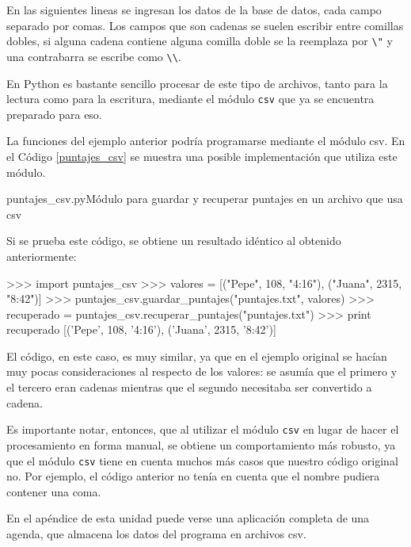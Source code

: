 En las siguientes lineas se ingresan los datos de la base de datos, cada
campo separado por comas. Los campos que son cadenas se suelen escribir
entre comillas dobles, si alguna cadena contiene alguna comilla doble se la
reemplaza por \verb!\"! y una contrabarra se escribe como \verb!\\!.

En Python es bastante sencillo procesar de este tipo de archivos, tanto
para la lectura como para la escritura, mediante el módulo \verb!csv! que
ya se encuentra preparado para eso.

La funciones del ejemplo anterior podría programarse mediante el módulo
csv.  En el Código \ref{puntajes_csv} se muestra una posible implementación
que utiliza este módulo.

\begin{codigo}{puntajes\_csv.py}{Módulo para guardar y recuperar puntajes en un archivo que usa csv}
\label{puntajes_csv}

\end{codigo}

Si se prueba este código, se obtiene un resultado idéntico al obtenido
anteriormente:

\begin{codigo-python-sn}
>>> import puntajes_csv
>>> valores = [("Pepe", 108, "4:16"), ("Juana", 2315, "8:42")]
>>> puntajes_csv.guardar_puntajes("puntajes.txt", valores)
>>> recuperado = puntajes_csv.recuperar_puntajes("puntajes.txt")
>>> print recuperado
[('Pepe', 108, '4:16'), ('Juana', 2315, '8:42')]
\end{codigo-python-sn}

El código, en este caso, es muy similar, ya que en el ejemplo original se
hacían muy pocas consideraciones al respecto de los valores: se asumía que
el primero y el tercero eran cadenas mientras que el segundo necesitaba ser
convertido a cadena.

\begin{observacion}
Es importante notar, entonces, que al utilizar el módulo \lstinline!csv!
en lugar de hacer el procesamiento en forma manual, se obtiene un
comportamiento más robusto, ya que el módulo \lstinline!csv! tiene en
cuenta muchos más casos que nuestro código original no. Por ejemplo, el
código anterior no tenía en cuenta que el nombre pudiera contener una coma.
\end{observacion}

En el apéndice de esta unidad puede verse una aplicación completa de una
agenda, que almacena los datos del programa en archivos csv.

